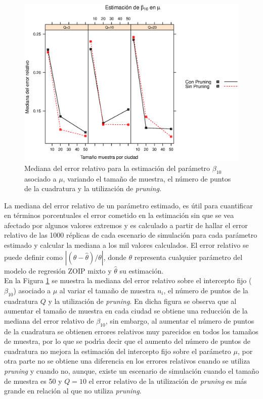 \begin{figure}
	\begin{center}
		\includegraphics[scale=0.6]{MAPE_beta0_mu.eps}	
		\caption{Mediana del error relativo para la estimaci\'{o}n del par\'{a}metro $\beta_{10}$ asociado a $\mu$, variando el tama\~{n}o de muestra, el n\'{u}mero de puntos de la cuadratura y  la utilizaci\'{o}n de \textit{pruning}.}
		\label{MAPE_bo_mu}
	\end{center}
\end{figure}

La mediana del error relativo de un par\'{a}metro estimado, es \'{u}til para cuantificar en t\'{e}rminos porcentuales el error cometido en la estimaci\'{o}n sin que se vea afectado por algunos valores extremos y es calculado a partir de hallar el error relativo de las 1000 r\'{e}plicas de cada escenario de simulaci\'{o}n para cada par\'{a}metro estimado y calcular la mediana a los mil valores calculados. El error relativo se puede definir como $|(\theta-\hat{\theta})/\theta|$, donde $\theta$ representa cualquier par\'{a}metro del modelo de regresi\'{o}n ZOIP mixto y $\hat{\theta}$ su estimaci\'{o}n.\\

En la Figura \ref{MAPE_bo_mu} se muestra la mediana del error relativo sobre el intercepto fijo ($\beta_{10}$) asociado a $\mu$ al variar el tama\~{n}o de muestra $n_i$, el n\'{u}mero de puntos de la cuadratura $Q$ y la utilizaci\'{o}n de \textit{pruning}. En dicha figura se observa que al aumentar el tama\~{n}o de muestra en cada ciudad se obtiene una reducci\'{o}n de la mediana del error relativo de $\beta_{10}$, sin embargo, al aumentar el n\'{u}mero de puntos de la cuadratura se obtienen errores relativos muy parecidos en todos los tama\~{n}os de muestra, por lo que se podr\'{\i}a decir que el aumento del n\'{u}mero de puntos de cuadratura no mejora la estimaci\'{o}n del intercepto fijo sobre el par\'{a}metro $\mu$, por otra parte no se obtiene una diferencia en los errores relativos cuando se utiliza \textit{pruning} y cuando no, aunque, existe un escenario de simulaci\'{o}n cuando el tama\~{n}o de muestra es 50 y $Q=10$ el error relativo de la utilizaci\'{o}n de \textit{pruning} es m\'{a}s grande en relaci\'{o}n al que no utiliza \textit{pruning}.\\



